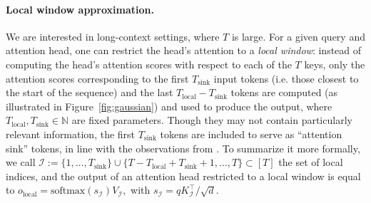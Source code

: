 \paragraph{Local window approximation.} 
We are interested in long-context settings, where $T$ is large. For a given query and attention head, one can restrict the head's attention to a \textit{local window}: instead of computing the head's attention scores with respect to each of the $T$ keys, only the attention scores corresponding to the first $T_{\text{sink}}$ input tokens (i.e. those closest to the start of the sequence) and the last $T_{\text{local}} - T_{\text{sink}}$ tokens are computed (as illustrated in Figure~\ref{fig:gaussian}) and used to produce the output, where $T_{\text{local}}, T_{\text{sink}} \in \mathbb{N}$ are fixed parameters. Though they may not contain particularly relevant information, the first $ T_{\text{sink}}$ tokens are included to serve as ``attention sink'' tokens, in line with the observations from \citet{xiao2023efficient}.
To summarize it more formally, we call $\mathcal I := \{1,\ldots, T_{\text{sink}}\} \cup \{T -  T_{\text{local}} + T_{\text{sink}}+1, \ldots, T\} \subset [T] $ the set of local indices, and the output of an attention head restricted to a local window is equal to $o_{\text{local}} = \text{softmax}(s_{\mathcal I}) V_{\mathcal I}, $ with $s_{\mathcal I} = q K_{\mathcal I}^\top /\sqrt{d}$. 








